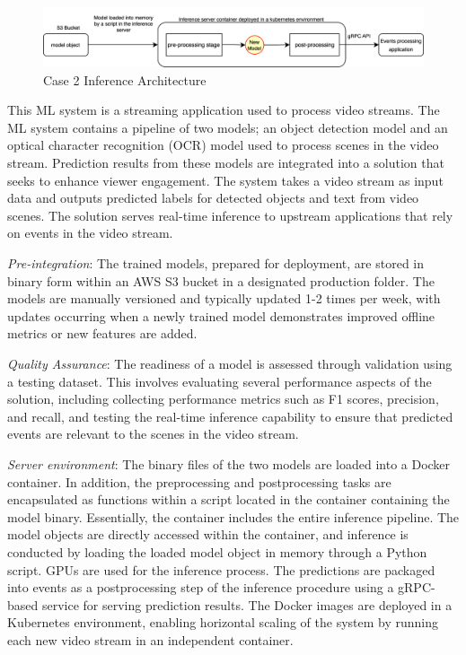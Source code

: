 \begin{figure}[b]
\centering
\includegraphics[width=\linewidth]{images/case2_deployment_process.png}
\caption{Case 2 Inference Architecture}
\label{fig: case2_deployment_process}
\end{figure}


This ML system is a streaming application used to process video streams. The ML system contains a pipeline of two models; an object detection model and an optical character recognition (OCR) model used to process scenes in the video stream. Prediction results from these models are integrated into a solution that seeks to enhance viewer engagement. The system takes a video stream as input data and outputs predicted labels for detected objects and text from video scenes. The solution serves real-time inference to upstream applications that rely on events in the video stream.

\textit{Pre-integration}: The trained models, prepared for deployment, are stored in binary form within an AWS S3 bucket in a designated production folder. The models are manually versioned and typically updated 1-2 times per week, with updates occurring when a newly trained model demonstrates improved offline metrics or new features are added.

\textit{Quality Assurance}: The readiness of a model is assessed through validation using a testing dataset. This involves evaluating several performance aspects of the solution, including collecting performance metrics such as F1 scores, precision, and recall, and testing the real-time inference capability to ensure that predicted events are relevant to the scenes in the video stream.

\textit{Server environment}: The binary files of the two models are loaded into a Docker container. In addition, the preprocessing and postprocessing tasks are encapsulated as functions within a script located in the container containing the model binary. Essentially, the container includes the entire inference pipeline. The model objects are directly accessed within the container, and inference is conducted by loading the loaded model object in memory through a Python script. GPUs are used for the inference process. The predictions are packaged into events as a postprocessing step of the inference procedure using a gRPC-based service for serving prediction results. The Docker images are deployed in a Kubernetes environment, enabling horizontal scaling of the system by running each new video stream in an independent container. %

